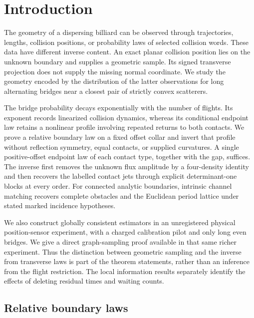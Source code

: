 \section{Introduction}
\label{sec:v27-introduction}
\label{sec:v26-introduction}
\label{sec:v25-introduction}

The geometry of a dispersing billiard can be observed through trajectories,
lengths, collision positions, or probability laws of selected collision
words.  These data have different inverse content.  An exact planar
collision position lies on the unknown boundary and supplies a geometric
sample.  Its signed transverse projection does not supply the missing
normal coordinate.  We study the geometry encoded by the distribution of
the latter observations for long alternating bridges near a closest pair
of strictly convex scatterers.

The bridge probability decays exponentially with the number of flights.
Its exponent records linearized collision dynamics, whereas its conditional
endpoint law retains a nonlinear profile involving repeated returns to both
contacts.  We prove a relative boundary law on a fixed offset collar and
invert that profile without reflection symmetry, equal contacts, or supplied
curvatures.  A single positive-offset endpoint law of each contact type,
together with the gap, suffices.  The inverse first removes the unknown
flux amplitude by a four-density identity and then recovers the labelled
contact jets through explicit determinant-one blocks at every order.
For connected analytic boundaries, intrinsic channel matching recovers
complete obstacles and the Euclidean period lattice under stated marked
incidence hypotheses.

We also construct globally consistent estimators in an unregistered
physical position-sensor experiment, with a charged calibration pilot and
only long even bridges.  We give a direct graph-sampling proof available
in that same richer experiment.  Thus the distinction between geometric
sampling and the inverse from transverse laws is part of the theorem
statements, rather than an inference from the flight restriction.  The
local information results separately identify the effects of deleting
residual times and waiting counts.

\subsection{Relative boundary laws}

